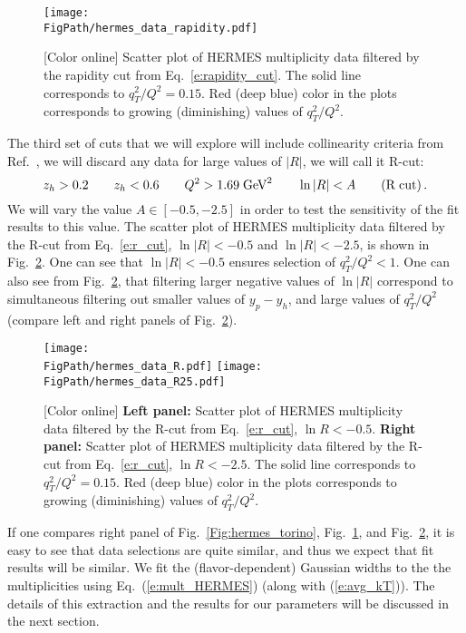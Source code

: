 \documentclass[final,3p,times,onecolumn,sort&compress,hidelinks]{elsarticle}
\newcommand\3[1]{\boldsymbol{#1}}
\newcommand*{\FigPath}{../Figs/}%
\begin{document}
\begin{figure}[htb!]
\centering
\texttt{[image: \\FigPath/hermes\_data\_rapidity.pdf]}
\caption{\label{Fig:hermes_new}
[Color online] Scatter plot of HERMES multiplicity data filtered by the rapidity cut from Eq.~\eqref{e:rapidity_cut}. The solid line corresponds to $q_T^2/Q^2=0.15$. Red (deep blue) color in the plots corresponds to growing (diminishing) values of $q_T^2/Q^2$.
}
\end{figure}

The third set of cuts that we will explore will include collinearity criteria from Ref.~\cite{Boglione:2016bph}, we will discard any data for large values of $|R|$, we will call it R-cut: 
 \begin{equation}
z_h > 0.2 \quad\quad  z_h < 0.6 \quad\quad Q^2 > 1.69 \; \textrm{GeV}^2  
\quad\quad   \ln |R|  < A \quad\quad{\rm (R\;cut)}\,.\label{e:r_cut}
\end{equation}
We will vary the value $A \in[-0.5, -2.5]$ in order to test the sensitivity of the fit results to this value. The scatter plot of HERMES multiplicity data filtered by the R-cut from Eq.~\eqref{e:r_cut},  $\ln |R|  < -0.5$ and $\ln |R| < -2.5$, is shown in Fig.~\ref{Fig:hermes_R}. One can see that $\ln |R|  < -0.5$ ensures selection of $q_T^2/Q^2<1$. One can also see from Fig.~\ref{Fig:hermes_R}, that filtering larger negative values of $\ln |R|$ correspond to simultaneous filtering out smaller values of $y_p - y_h$, and large values of $q_T^2/Q^2$ (compare left and right panels of Fig.~\ref{Fig:hermes_R}).
 
\begin{figure}[htb!]
\centering
\texttt{[image: \\FigPath/hermes\_data\_R.pdf]}
\texttt{[image: \\FigPath/hermes\_data\_R25.pdf]}
\caption{\label{Fig:hermes_R}
[Color online] {\bf Left panel:} Scatter plot of HERMES multiplicity data filtered by the R-cut from Eq.~\eqref{e:r_cut},  $\ln R  < -0.5$. {\bf Right panel:} Scatter plot of HERMES multiplicity data filtered by the R-cut from Eq.~\eqref{e:r_cut},  $\ln R  < -2.5$. The solid line corresponds to $q_T^2/Q^2=0.15$. Red (deep blue) color in the plots corresponds to growing (diminishing) values of $q_T^2/Q^2$.
}
\end{figure}
 

 
If one compares right panel of Fig.~\ref{Fig:hermes_torino},  Fig.~\ref{Fig:hermes_new}, and Fig.~\ref{Fig:hermes_R}, it is easy to see that data selections are quite similar, and thus we expect that fit results will be similar. We fit the (flavor-dependent) Gaussian widths to the the multiplicities using Eq.~(\ref{e:mult_HERMES}) (along with (\ref{e:avg_kT})).  The details of this extraction and the results for our parameters will be discussed in the next section.
\end{document}
